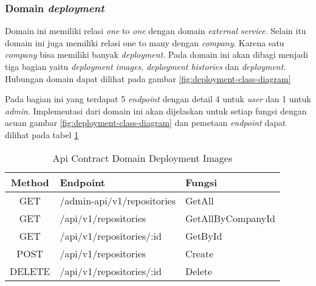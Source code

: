 \subsubsection{Domain \textit{deployment}}

Domain ini memiliki relasi \textit{one} to \textit{one} dengan domain \textit{external service}. Selain itu domain ini juga memiliki relasi one to many dengan \textit{company}. Karena satu \textit{company} bisa memiliki banyak \textit{deployment}. Pada domain ini akan dibagi menjadi tiga bagian yaitu \textit{deployment images}, \textit{deployment histories} dan \textit{deployment}. Hubungan domain dapat dilihat pada gambar \ref{fig:deployment-class-diagram}

Pada bagian ini yang terdapat 5 \textit{endpoint} dengan detail 4 untuk \textit{user} dan 1 untuk \textit{admin}. Implementasi dari domain ini akan dijelaskan untuk setiap fungsi dengan acuan gambar \ref{fig:deployment-class-diagram} dan pemetaan \textit{endpoint} dapat dilihat pada tabel \ref{tab:api-contract-domain-deployment-images}

\bgroup
\begin{table}[ht]
  \caption{Api Contract Domain Deployment Images}
  \label{tab:api-contract-domain-deployment-images}
  \def\arraystretch{1.7}
  \centering
  \begin{tabular}{|c|p{6cm}|p{4cm}|}
    \hline
    Method & Endpoint                   &
    Fungsi                                                  \\
    \hline
    GET    & /admin-api/v1/repositories & GetAll            \\
    \hline
    GET    & /api/v1/repositories       & GetAllByCompanyId \\
    \hline
    GET    & /api/v1/repositories/:id   & GetById           \\
    \hline
    POST   & /api/v1/repositories       & Create            \\
    \hline
    DELETE & /api/v1/repositories/:id   & Delete            \\
    \hline
  \end{tabular}
\end{table}
\egroup


